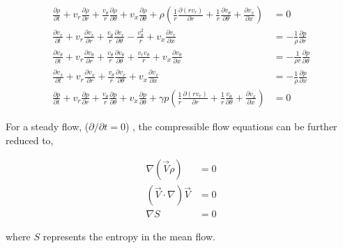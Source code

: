 \begin{align}
\frac{\partial \rho}{\partial t} + %
v_r \frac{\partial \rho}{\partial r} +
\frac{v_{\theta}   }{r}
\frac{\partial \rho}{\partial \theta} +
v_x \frac{\partial \rho}{\partial \theta} + 
\rho 
\left(
\frac{1}{r} \frac{\partial (rv_r)	}{\partial r} +
\frac{1}{r}	\frac{\partial v_{\theta}}{\partial \theta} +
\frac{\partial v_x}{\partial x}
\right) 
&= 0 \\%
\frac{\partial v_r}{\partial t} + 
v_r \frac{\partial v_r}{\partial r} +
\frac{v_{\theta}  }{r}
\frac{\partial v_r}{\partial \theta}- \frac{v_{\theta}^2}{r}+ 
v_x \frac{\partial v_r}{\partial x} 
&= -\frac{1}{\rho} \frac{\partial p}{\partial r}\\  
\frac{\partial v_{\theta}}{\partial t} + 
v_r \frac{\partial v_{\theta}}{\partial r} +
\frac{v_{\theta}}{r}
\frac{\partial v_{\theta}}{\partial \theta} +
\frac{v_r v_{\theta}}{r}+ 
v_x \frac{\partial v_{\theta}}{\partial x} 
&= -\frac{1}{\rho r} \frac{\partial p}{\partial \theta}\\ 
\frac{\partial v_{x}}{\partial t} + 
v_r 
\frac{\partial v_x}{\partial r} +
\frac{v_{\theta}}{r}
\frac{\partial v_x}{\partial \theta}+ 
v_x \frac{\partial v_x}{\partial x} 
&= 
-\frac{1}{\rho } 
\frac{\partial p}{\partial x}\\  
\frac{\partial p }{\partial t} +
v_r 
\frac{\partial p}{\partial r} +
\frac{v_{\theta}}{r}
\frac{\partial p}{\partial \theta} +
v_x \frac{\partial p}{\partial \theta} + 
\gamma p 
\left(
\frac{1}{r}\frac{\partial (rv_r)}{\partial r} +
\frac{1}{r}\frac{v_{\theta}}{\partial \theta} +
\frac{\partial v_x}{\partial x}
\right) &= 0
\end{align}

For a steady flow, ($\partial/\partial t = 0$) , the compressible flow equations
can be further reduced to,

\begin{align}
    \nabla (\vec{V} \rho) &=  0 \\
    (\vec{V}\cdot \nabla) \vec{V} &=  0\\
    \nabla S &= 0
\end{align}

where $S$ represents the entropy in the mean flow.



